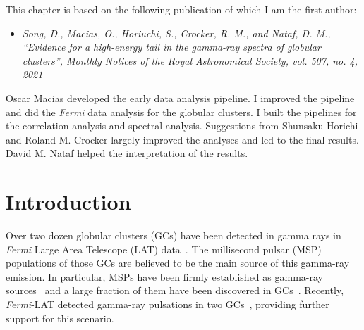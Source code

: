 \documentclass[doublespace,nopageskip]{VTthesis} %
\begin{document}
This chapter is based on the following publication of which I am the first author:
\begin{itemize}
    \item \emph{Song, D., Macias, O., Horiuchi, S., Crocker, R. M., and Nataf, D. M., “Evidence for a high-energy tail in the gamma-ray spectra of globular clusters”, Monthly Notices of the Royal Astronomical Society, vol. 507, no. 4, 2021}
\end{itemize}
Oscar Macias developed the early data analysis pipeline. I improved the pipeline and did the \textit{Fermi} data analysis for the globular clusters. I built the pipelines for the correlation analysis and spectral analysis. Suggestions from Shunsaku Horichi and Roland M. Crocker largely improved the analyses and led to the final results. David M. Nataf helped the interpretation of the results.

\section{Introduction}\label{sec:intro}

Over two dozen globular clusters (GCs) have been detected in gamma rays in {\it Fermi} Large Area Telescope (LAT) data~\citep{2009Sci...325..845A,2010A&A...524A..75A,2010ApJ...712L..36K,2011ApJ...729...90T,2015MNRAS.448.3215Z,2016MNRAS.459...99Z}. The millisecond pulsar (MSP) populations of those GCs are believed to be the main source of this gamma-ray emission. In particular, MSPs have been firmly established as gamma-ray sources~\citep{1996A&A...311L...9V,2009ApJ...699.1171A,2013MNRAS.430..571E,2013ApJS..208...17A} and a large fraction of them have been discovered in GCs~\citep{2005ASPC..328..147C}. Recently, \textit{Fermi}-LAT detected gamma-ray pulsations in two GCs~\citep{2011Sci...334.1107F,2013ApJ...778..106J}, providing further support for this scenario.
\end{document}
